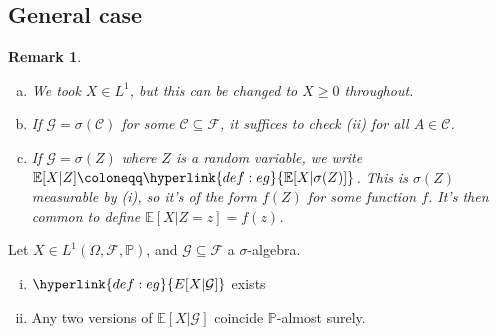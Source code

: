 \documentclass{article}
\newtheorem{nremark}[nthm]{Remark}
\newcommand{\named}[1]{\textbf{#1}\index{#1}}
\newcommand{\F}{\mathcal{F}}
\newcommand{\G}{\mathcal{G}}
\newcommand{\1}[1]{\mathbbm{1}_{#1}}
\newcommand{\Prob}{\mathbb{P}}
\newcommand{\E}{\mathbb{E}}
\begin{document}
\subsection{General case}
\begin{nremark}\leavevmode
  \begin{enumerate}[(a)]
    \item We took $X \in L^1$, but this can be changed to $X \geq 0$ throughout.
    \item If $\G = \sigma(\mathcal{C})$ for some $\mathcal{C} \subseteq \F$, it suffices to check (ii) for all $A \in \mathcal{C}$.
    \item If $\G = \sigma(Z)$ where $Z$ is a random variable, we write $\E[X | Z] \coloneqq \hyperlink{def:eg}{\E[X | \sigma(Z)]}$. This is $\sigma(Z)$ measurable by (i), so it's of the form $f(Z)$ for some function $f$.
      It's then common to define $\E[X | Z=z] = f(z)$.
  \end{enumerate}
\end{nremark}
\begin{nthm}
  Let $X \in L^1(\Omega, \F, \Prob)$, and $\G \subseteq \F$ a $\sigma$-algebra.
  \begin{enumerate}[(i)]
    \item $\hyperlink{def:eg}{E[X | \G]}$ exists
    \item Any two versions of $\E[X | \G]$ coincide $\Prob$-almost surely.
  \end{enumerate}
\end{nthm}
\end{document}
